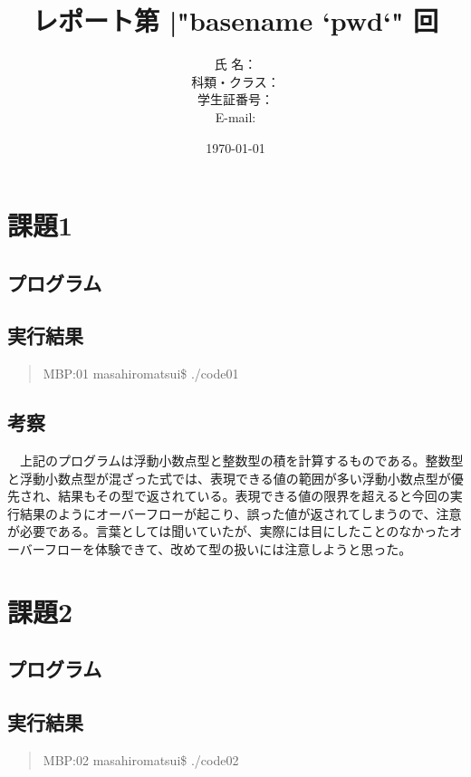 \documentclass[11pt,a4paper]{jsarticle}
\title{レポート第 {|"basename `pwd`"} 回 } %
\author{氏 名：  \\
        科類・クラス： \\
        学生証番号： \\
        E-mail: }
\date{\today}
\begin{document}
\maketitle
%
\section{課題1}

\subsection{プログラム}
\label{sec:prog-list1}

%
\subsection{実行結果}
\label{sec:results1}

\begin{quote}           %
MBP:01 masahiromatsui\$ ./code01 \\

\end{quote}
%
\subsection{考察}
　上記のプログラムは浮動小数点型と整数型の積を計算するものである。整数型と浮動小数点型が混ざった式では、表現できる値の範囲が多い浮動小数点型が優先され、結果もその型で返されている。表現できる値の限界を超えると今回の実行結果のようにオーバーフローが起こり、誤った値が返されてしまうので、注意が必要である。言葉としては聞いていたが、実際には目にしたことのなかったオーバーフローを体験できて、改めて型の扱いには注意しようと思った。

%
\section{課題2}

\subsection{プログラム}
\label{sec:prog-list1}


%
\subsection{実行結果}
\begin{quote}           %
MBP:02 masahiromatsui\$ ./code02 \\

\end{quote}
%
\end{document}
